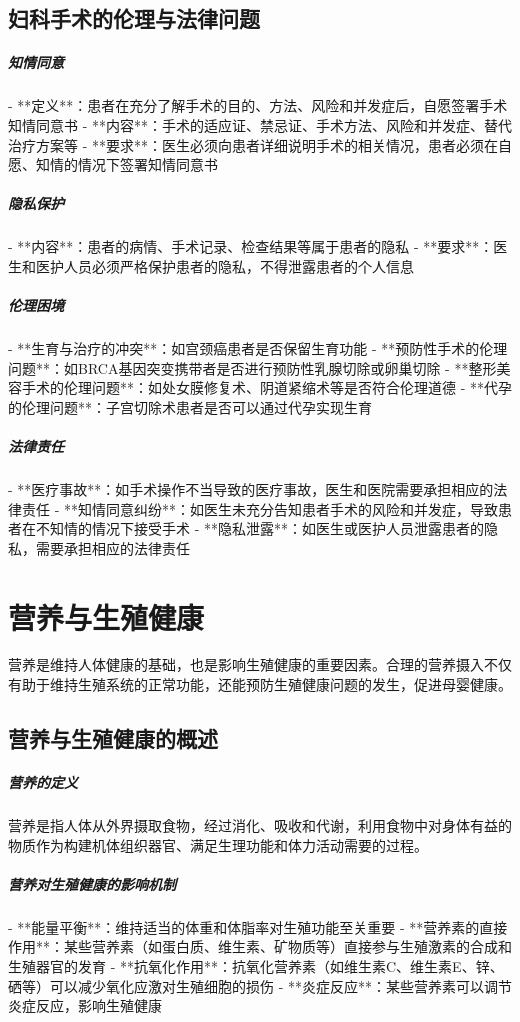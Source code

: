 \begin{enumerate}
\subsection{妇科手术的伦理与法律问题}

\subparagraph{知情同意}

- **定义**：患者在充分了解手术的目的、方法、风险和并发症后，自愿签署手术知情同意书
- **内容**：手术的适应证、禁忌证、手术方法、风险和并发症、替代治疗方案等
- **要求**：医生必须向患者详细说明手术的相关情况，患者必须在自愿、知情的情况下签署知情同意书

\subparagraph{隐私保护}

- **内容**：患者的病情、手术记录、检查结果等属于患者的隐私
- **要求**：医生和医护人员必须严格保护患者的隐私，不得泄露患者的个人信息

\subparagraph{伦理困境}

- **生育与治疗的冲突**：如宫颈癌患者是否保留生育功能
- **预防性手术的伦理问题**：如BRCA基因突变携带者是否进行预防性乳腺切除或卵巢切除
- **整形美容手术的伦理问题**：如处女膜修复术、阴道紧缩术等是否符合伦理道德
- **代孕的伦理问题**：子宫切除术患者是否可以通过代孕实现生育

\subparagraph{法律责任}

- **医疗事故**：如手术操作不当导致的医疗事故，医生和医院需要承担相应的法律责任
- **知情同意纠纷**：如医生未充分告知患者手术的风险和并发症，导致患者在不知情的情况下接受手术
- **隐私泄露**：如医生或医护人员泄露患者的隐私，需要承担相应的法律责任

\section{营养与生殖健康}

营养是维持人体健康的基础，也是影响生殖健康的重要因素。合理的营养摄入不仅有助于维持生殖系统的正常功能，还能预防生殖健康问题的发生，促进母婴健康。

\subsection{营养与生殖健康的概述}

\subparagraph{营养的定义}
营养是指人体从外界摄取食物，经过消化、吸收和代谢，利用食物中对身体有益的物质作为构建机体组织器官、满足生理功能和体力活动需要的过程。

\subparagraph{营养对生殖健康的影响机制}

- **能量平衡**：维持适当的体重和体脂率对生殖功能至关重要
- **营养素的直接作用**：某些营养素（如蛋白质、维生素、矿物质等）直接参与生殖激素的合成和生殖器官的发育
- **抗氧化作用**：抗氧化营养素（如维生素C、维生素E、锌、硒等）可以减少氧化应激对生殖细胞的损伤
- **炎症反应**：某些营养素可以调节炎症反应，影响生殖健康


\end{enumerate}
